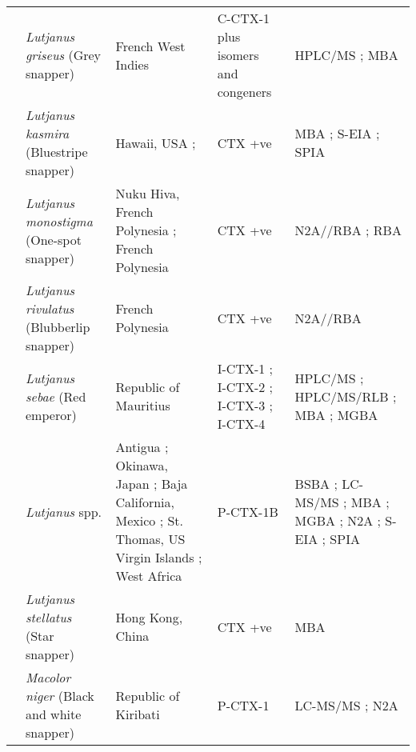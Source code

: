 \documentclass[12pt]{article}
\begin{document}
\begin{longtable}[l]{ | p{2cm} | p{3cm} | p{4.5cm} | p{2cm} | p{3cm} | }
	& \emph{Lutjanus griseus} (Grey snapper) & French West Indies \cite{pottier2002analysis} & C-CTX-1 plus isomers and congeners \cite{pottier2002analysis} & HPLC/MS \cite{pottier2002analysis}; MBA \cite{pottier2002analysis}\\
	& \emph{Lutjanus kasmira} (Bluestripe snapper) & Hawaii, USA \cite{hokama1993evaluation};& CTX +ve \cite{hokama1993evaluation} & MBA \cite{hokama1993evaluation}; S-EIA \cite{hokama1993evaluation}; SPIA \cite{hokama1993evaluation} \\
	& \emph{Lutjanus monostigma} (One-spot snapper)& Nuku Hiva, French Polynesia \cite{darius2007ciguatera}; French Polynesia \cite{chinain2014mail} & CTX +ve \cite{darius2007ciguatera,chinain2014mail} & N2A//RBA \cite{chinain2014mail}; RBA \cite{darius2007ciguatera} \\
	& \emph{Lutjanus rivulatus} (Blubberlip snapper) & French Polynesia \cite{chinain2014mail} & CTX +ve \cite{chinain2014mail} & N2A//RBA \cite{chinain2014mail} \\
	& \emph{Lutjanus sebae} (Red emperor) & Republic of Mauritius \cite{hamilton2002multiple,hamilton2002isolation} & I-CTX-1 \cite{hamilton2002multiple,hamilton2002isolation}; I-CTX-2 \cite{hamilton2002multiple,hamilton2002isolation}; I-CTX-3 \cite{hamilton2002multiple,hamilton2002isolation}; I-CTX-4 \cite{hamilton2002multiple,hamilton2002isolation} & HPLC/MS \cite{hamilton2002multiple,hamilton2002isolation}; HPLC/MS/RLB \cite{hamilton2002multiple,hamilton2002isolation}; MBA \cite{hamilton2002multiple,hamilton2002isolation}; MGBA \cite{hamilton2002multiple,hamilton2002isolation} \\ %
	& \emph{Lutjanus} spp. & Antigua \cite{hokama1990simplified}; Okinawa, Japan \cite{yogi2011detailed}; Baja California, Mexico \cite{parrilla1992outbreaks}; St. Thomas, US Virgin Islands \cite{granade1976ciguatera}; West Africa \cite{bienfang2008ciguatera} & P-CTX-1B \cite{yogi2011detailed} & BSBA \cite{granade1976ciguatera}; LC-MS/MS \cite{yogi2011detailed}; MBA \cite{parrilla1992outbreaks}; MGBA \cite{granade1976ciguatera}; N2A \cite{bienfang2008ciguatera}; S-EIA \cite{hokama1990simplified}; SPIA \cite{hokama1990simplified} \\
	& \emph{Lutjanus stellatus} (Star snapper) & Hong Kong, China \cite{wong2008features} & CTX +ve \cite{wong2008features} & MBA \cite{wong2008features} \\
	& \emph{Macolor niger} (Black and white snapper) & Republic of Kiribati \cite{mak2013pacific} & P-CTX-1 \cite{mak2013pacific} & LC-MS/MS \cite{mak2013pacific}; N2A \cite{mak2013pacific} \\

\end{longtable}
\end{document}
